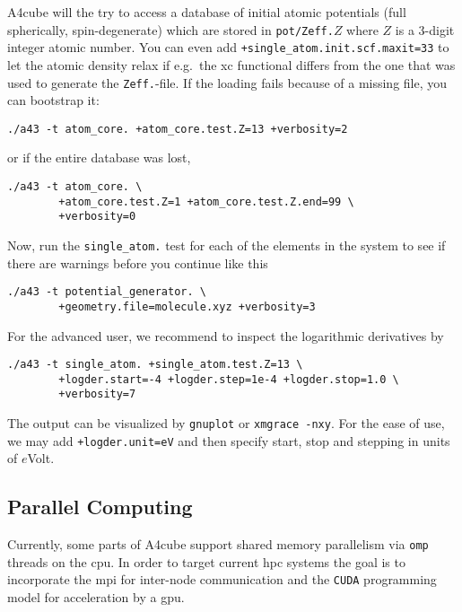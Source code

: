 \documentclass[oribibl]{llncs}
\newcommand{\ttt}[1]{\texttt{#1}}
\newcommand{\codename}{A4cube}
\begin{document}
\codename{} will the try to access a database of initial atomic potentials
(full spherically, spin-degenerate) which are stored in \ttt{pot/Zeff.}$Z$
where $Z$ is a 3-digit integer atomic number.
You can even add \ttt{+single\_atom.init.scf.maxit=33} to let the atomic density relax if e.g.~the \ac{xc} functional differs from the one that was used to generate the \ttt{Zeff.}-file.
If the loading fails because of a missing file, you can bootstrap it:
\begin{verbatim}
./a43 -t atom_core. +atom_core.test.Z=13 +verbosity=2
\end{verbatim}
or if the entire database was lost,
\begin{verbatim}
./a43 -t atom_core. \
        +atom_core.test.Z=1 +atom_core.test.Z.end=99 \
        +verbosity=0
\end{verbatim}

Now, run the \ttt{single\_atom.} test for each of the elements in the system to see if there are warnings before you continue like this
\begin{verbatim}
./a43 -t potential_generator. \
        +geometry.file=molecule.xyz +verbosity=3
\end{verbatim}

For the advanced user, we recommend to inspect the logarithmic derivatives by
\begin{verbatim}
./a43 -t single_atom. +single_atom.test.Z=13 \
        +logder.start=-4 +logder.step=1e-4 +logder.stop=1.0 \
        +verbosity=7
\end{verbatim}
The output can be visualized by \ttt{gnuplot} or \ttt{xmgrace -nxy}.
For the ease of use, we may add \ttt{+logder.unit=eV} and then specify
start, stop and stepping in units of $e$Volt.

\subsection{Parallel Computing}
Currently, some parts of \codename{} support shared memory parallelism 
via \ttt{omp} threads on the \ac{cpu}.
In order to target current \ac{hpc} systems 
the goal is to incorporate the \ac{mpi}
for inter-node communication
and the \ttt{CUDA} programming model for acceleration by a \ac{gpu}.
\todo[inline]{MPI parallelize}
\end{document}
